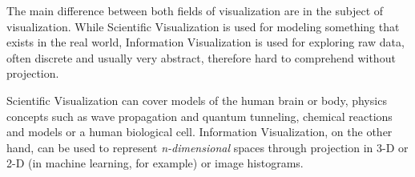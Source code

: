 \documentclass[12pt]{article}
\begin{document}
The main difference between both fields of visualization are in the subject of visualization. While Scientific Visualization is used for modeling something that exists in the real world, Information Visualization is used for exploring raw data, often discrete and usually very abstract, therefore hard to comprehend without projection.

Scientific Visualization can cover models of the human brain or body, physics concepts such as wave propagation and quantum tunneling, chemical reactions and models or a human biological cell. Information Visualization, on the other hand, can be used to represent \textit{n-dimensional} spaces through projection in 3-D or 2-D (in machine learning, for example) or image histograms.
\end{document}
